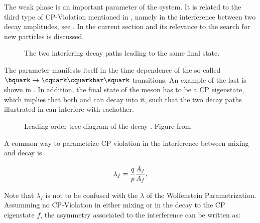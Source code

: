 The weak phase \phis is an important parameter of the \BBbarSyst system. It is related to the third
type of CP-Violation mentioned in , namely in the interference between
two decay amplitudes, see . In the current section \phis and its relevance to
the search for new particles is discussed.

\newcommand{\ffig}{f}
\newcommand{\phimixfig}{\phi_\text{mix}}
\newcommand{\phifig}{\phi_\text{dec}}
\newcommand{\phibarfig}{\kern 0.15em \overline{\kern -0.15em \phi_\text{dec} \kern -0.60em} \kern 0.60em}
\begin{figure}[h]
  \centering
  \resizebox{0.4\textwidth}{!}{}
  \caption{The two interfering decay paths leading to the same final state.}
  \label{interference}
\end{figure}

The parameter \phis manifests itself in the time dependence of the so called $\bquark \rightarrow \cquark\cquarkbar\squark $ transitions.
An example of the last is shown in . In addition, the final state of the \Bs meson has to be
a CP eigenstate, which implies that both \Bs and \Bsb can decay into it, such that the two decay paths
illustrated in  can interfere with eachother.

\begin{figure}[!h]
  \centering
  {\sffamily }
  \caption{Leading order tree diagram of the decay \BsJpsiPhi. Figure from~\cite{jeroenThesis}}
  \label{bs2jpsiphi}
\end{figure}

A common way to parametrize CP violation in the interference between mixing and decay is

\begin{equation}
  \centering
 \lambda_{f} = \frac{q}{p} \frac{\bar{A}_f}{A_f}, %
\label{lambda_cpv}
\end{equation}

\noindent Note that $\lambda_f$ is not to be confused with the $\lambda$ of the Wolfenstein Parametrization.
Assumming no CP-Violation in either \BBbarSyst mixing or in the decay to the CP eigenstate $f$, the asymmetry
associated to the interference can be written as:


